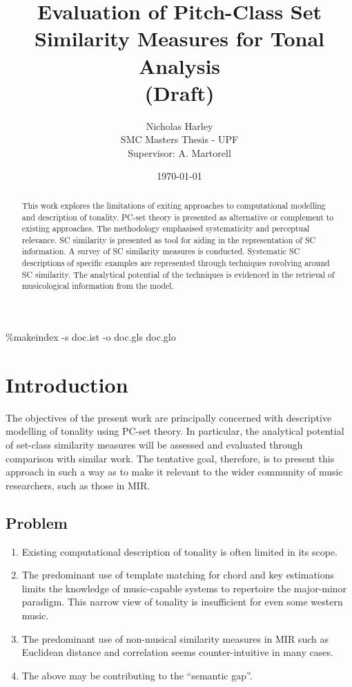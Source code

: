 \documentclass{article}
\title{Evaluation of Pitch-Class Set\\Similarity Measures for Tonal Analysis\\(Draft)}
\author{Nicholas Harley\\SMC Masters Thesis - UPF\\Supervisor: A. Martorell}
\date{\today}
\begin{document}
\maketitle

\clearpage

\begin{abstract}

This work explores the limitations of exiting approaches to computational modelling and description of tonality. PC-set theory is presented as alternative or complement to existing approaches. The methodology emphasised systematicity and perceptual relevance. SC similarity is presented as tool for aiding in the representation of SC information. A survey of SC similarity measures is conducted. Systematic SC descriptions of specific examples are represented through techniques rovolving around SC similarity. The analytical potential of the techniques is evidenced in the retrieval of musicological information from the model.

\end{abstract}

\clearpage

\setcounter{tocdepth}{3}
\tableofcontents
\vspace*{1cm}


\clearpage
\glsaddall
\printglossary[title=PC-Set Theory Glossary]
\%makeindex -s doc.ist -o doc.gls doc.glo
\clearpage

\section{Introduction}
\label{sec-1}

The objectives of the present work are principally concerned with
descriptive modelling of tonality using PC-set theory. In particular,
the analytical potential of set-class similarity measures will be
assessed and evaluated through comparison with similar work. The
tentative goal, therefore, is to present this approach in such a way
as to make it relevant to the wider community of music researchers,
such as those in MIR.
\subsection{Problem}
\label{sec-1-1}

\begin{enumerate}
\item Existing computational description of tonality is often limited in
   its scope.
\item The predominant use of template matching for chord and key
   estimations limits the knowledge of music-capable systems to
   repertoire the major-minor paradigm. This narrow view of tonality is
   insufficient for even some western music.
\item The predominant use of non-musical similarity measures in MIR such
   as Euclidean distance and correlation seems counter-intuitive in
   many cases.
\item The above may be contributing to the ``semantic gap''.
\end{enumerate}
\end{document}
